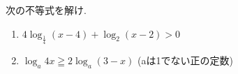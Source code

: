 \documentclass[8pt,dvipdfmx]{article}[b5paper]
\begin{document}
\begin{tcolorbox}[title=数学\textcircled{\scriptsize 2} 2-4 BC]
次の不等式を解け.
\begin{enumerate}[(1)]
   \item \( 4\log_{\frac{1}{4}} (x - 4) + \log_2 (x - 2) > 0 \)
    \item \( \log_a 4x \geqq 2 \log_a (3 - x) \) \quad (aは1でない正の定数)
\end{enumerate}
\end{tcolorbox}




\end{document}
